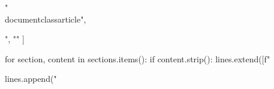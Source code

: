 "\\documentclass{article}",
\begin{document}
",
            ""
        ]
        
        for section, content in sections.items():
            if content.strip():
                lines.extend([f"%
        
        lines.append("\
\end{document}
